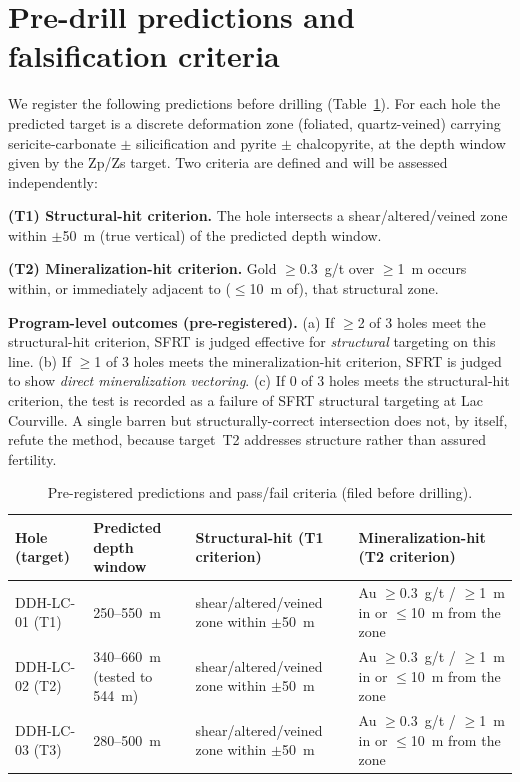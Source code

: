 \documentclass[11pt]{article}
\begin{document}
\section{Pre-drill predictions and falsification criteria}\label{sec:predictions}
We register the following predictions before drilling (Table~\ref{tab:pred}). For each hole the
predicted target is a discrete deformation zone (foliated, quartz-veined) carrying
sericite-carbonate $\pm$ silicification and pyrite $\pm$ chalcopyrite, at the depth window given
by the Zp/Zs target. Two criteria are defined and will be assessed independently:

\textbf{(T1) Structural-hit criterion.} The hole intersects a shear/altered/veined zone within
$\pm$50~m (true vertical) of the predicted depth window.

\textbf{(T2) Mineralization-hit criterion.} Gold $\ge$0.3~g/t over $\ge$1~m occurs within, or
immediately adjacent to ($\le$10~m of), that structural zone.

\textbf{Program-level outcomes (pre-registered).} (a) If $\ge$2 of 3 holes meet the
structural-hit criterion, SFRT is judged effective for \emph{structural} targeting on this line.
(b) If $\ge$1 of 3 holes meets the mineralization-hit criterion, SFRT is judged to show
\emph{direct mineralization vectoring}. (c) If 0 of 3 holes meets the structural-hit criterion,
the test is recorded as a failure of SFRT structural targeting at Lac Courville. A single barren
but structurally-correct intersection does not, by itself, refute the method, because target~T2
addresses structure rather than assured fertility.

\begin{table}[t]
\centering\small
\caption{Pre-registered predictions and pass/fail criteria (filed before drilling).}
\label{tab:pred}
\begin{tabular}{p{2.2cm}p{2.0cm}p{4.6cm}p{4.0cm}}
\toprule
Hole (target) & Predicted depth window & Structural-hit (T1 criterion) & Mineralization-hit (T2 criterion) \\
\midrule
DDH-LC-01 (T1) & 250--550~m & shear/altered/veined zone within $\pm$50~m & Au $\ge$0.3~g/t / $\ge$1~m in or $\le$10~m from the zone \\
DDH-LC-02 (T2) & 340--660~m (tested to 544~m) & shear/altered/veined zone within $\pm$50~m & Au $\ge$0.3~g/t / $\ge$1~m in or $\le$10~m from the zone \\
DDH-LC-03 (T3) & 280--500~m & shear/altered/veined zone within $\pm$50~m & Au $\ge$0.3~g/t / $\ge$1~m in or $\le$10~m from the zone \\
\bottomrule
\end{tabular}
\end{table}
\end{document}
